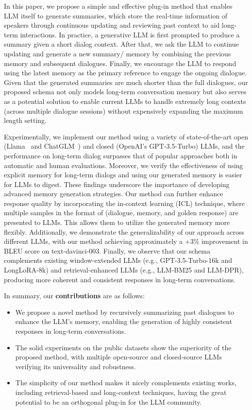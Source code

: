 \documentclass[authoryear,preprint,review,12pt]{elsarticle}
\begin{document}
In this paper, we propose a simple and effective plug-in method that enables LLM itself to generate summaries, which store the real-time information of speakers through continuous updating and reviewing past context to aid long-term interactions. In practice, a generative LLM is first prompted to produce a summary given a short dialog context. After that, we ask the LLM to continue updating and generate a new summary/ memory by combining the previous memory and subsequent dialogues. Finally, we encourage the LLM to respond using the latest memory as the primary reference to engage the ongoing dialogue. Given that the generated summaries are much shorter than the full dialogues, our proposed schema not only models long-term conversation memory but also serves as a potential solution to enable current LLMs to handle extremely long contexts (across multiple dialogue sessions) without expensively expanding the maximum length setting.

Experimentally, we implement our method using a variety of state-of-the-art open (Llama~\citep{llama2} and ChatGLM~\citep{glm2024chatglm}) and closed (OpenAI's GPT-3.5-Turbo) LLMs, and the performance on long-term dialog surpasses that of popular approaches both in automatic and human evaluations. Moreover, we verify the effectiveness of using explicit memory for long-term dialogs and using our generated memory is easier for LLMs to digest. These findings underscore the importance of developing advanced memory generation strategies. Our method can further enhance response quality by incorporating the in-context learning (ICL) technique, where multiple samples in the format of (dialogue, memory, and golden response) are presented to LLMs. This allows them to utilize the generated memory more flexibly. Additionally, we demonstrate the generalizability of our approach across different LLMs, with our method achieving approximately a +3\% improvement in BLEU score on text-davinci-003. Finally, we observe that our schema complements existing window-extended LLMs (e.g., GPT-3.5-Turbo-16k and LongLoRA-8k) and retrieval-enhanced LLMs (e.g., LLM-BM25 and LLM-DPR), producing more coherent and consistent responses in long-term conversations.

In summary, our \textbf{contributions} are as follows:
\begin{itemize}
    \item We propose a novel method by recursively summarizing past dialogues to enhance the LLM's memory, enabling the generation of highly consistent responses in long-term conversations.
    \item The solid experiments on the public datasets show the superiority of the proposed method, with multiple open-source and closed-source LLMs verifying its universality and robustness.
    \item The simplicity of our method makes it nicely complements existing works, including retrieval-based and long-context techniques, having the great potential to be an orthogonal plug-in for the LLM community.
\end{itemize}
\end{document}
